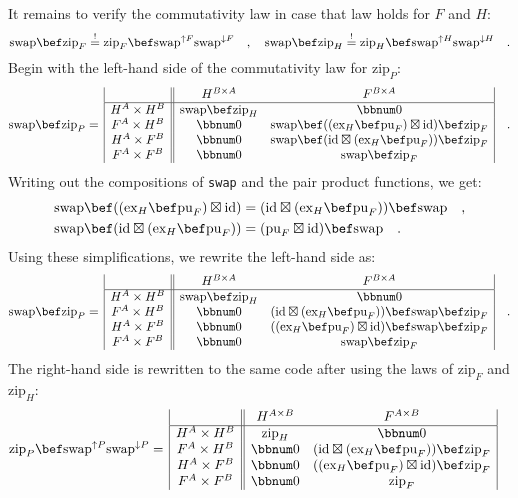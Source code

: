 It remains to verify the commutativity law in case that law holds
for $F$ and $H$:
\[
\text{swap}\bef\text{zip}_{F}\overset{!}{=}\text{zip}_{F}\bef\text{swap}^{\uparrow F}\text{swap}^{\downarrow F}\quad,\quad\text{swap}\bef\text{zip}_{H}\overset{!}{=}\text{zip}_{H}\bef\text{swap}^{\uparrow H}\text{swap}^{\downarrow H}\quad.
\]
Begin with the left-hand side of the commutativity law for $\text{zip}_{P}$:
\[
\text{swap}\bef\text{zip}_{P}=\,\begin{array}{|c||cc|}
 & H^{B\times A} & F^{B\times A}\\
\hline H^{A}\times H^{B} & \text{swap}\bef\text{zip}_{H} & \bbnum 0\\
F^{A}\times H^{B} & \bbnum 0 & \text{swap}\bef((\text{ex}_{H}\bef\text{pu}_{F})\boxtimes\text{id})\bef\text{zip}_{F}\\
H^{A}\times F^{B} & \bbnum 0 & \text{swap}\bef(\text{id}\boxtimes(\text{ex}_{H}\bef\text{pu}_{F}))\bef\text{zip}_{F}\\
F^{A}\times F^{B} & \bbnum 0 & \text{swap}\bef\text{zip}_{F}
\end{array}\quad.
\]
Writing out the compositions of \lstinline!swap! and the pair product
functions, we get:
\begin{align*}
 & \text{swap}\bef((\text{ex}_{H}\bef\text{pu}_{F})\boxtimes\text{id})=(\text{id}\boxtimes(\text{ex}_{H}\bef\text{pu}_{F}))\bef\text{swap}\quad,\\
 & \text{swap}\bef(\text{id}\boxtimes(\text{ex}_{H}\bef\text{pu}_{F}))=(\text{pu}_{F}\boxtimes\text{id})\bef\text{swap}\quad.
\end{align*}
Using these simplifications, we rewrite the left-hand side as:
\[
\text{swap}\bef\text{zip}_{P}=\,\begin{array}{|c||cc|}
 & H^{B\times A} & F^{B\times A}\\
\hline H^{A}\times H^{B} & \text{swap}\bef\text{zip}_{H} & \bbnum 0\\
F^{A}\times H^{B} & \bbnum 0 & (\text{id}\boxtimes(\text{ex}_{H}\bef\text{pu}_{F}))\bef\text{swap}\bef\text{zip}_{F}\\
H^{A}\times F^{B} & \bbnum 0 & ((\text{ex}_{H}\bef\text{pu}_{F})\boxtimes\text{id})\bef\text{swap}\bef\text{zip}_{F}\\
F^{A}\times F^{B} & \bbnum 0 & \text{swap}\bef\text{zip}_{F}
\end{array}\quad.
\]
The right-hand side is rewritten to the same code after using the
laws of $\text{zip}_{F}$ and $\text{zip}_{H}$:
\begin{align*}
\text{zip}_{P}\bef\text{swap}^{\uparrow P}\text{swap}^{\downarrow P} & =\,\begin{array}{|c||cc|}
 & H^{A\times B} & F^{A\times B}\\
\hline H^{A}\times H^{B} & \text{zip}_{H} & \bbnum 0\\
F^{A}\times H^{B} & \bbnum 0 & (\text{id}\boxtimes(\text{ex}_{H}\bef\text{pu}_{F}))\bef\text{zip}_{F}\\
H^{A}\times F^{B} & \bbnum 0 & ((\text{ex}_{H}\bef\text{pu}_{F})\boxtimes\text{id})\bef\text{zip}_{F}\\
F^{A}\times F^{B} & \bbnum 0 & \text{zip}_{F}
\end{array}
\end{align*}
